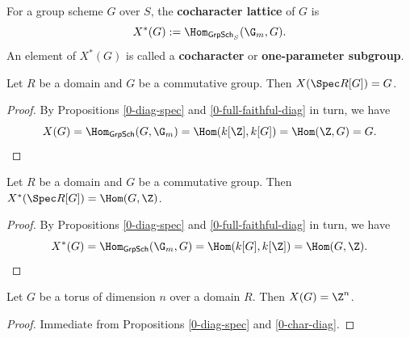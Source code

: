 \begin{definition}
  \label{0-cochar}
  \leanok

  For a group scheme $G$ over $S$, the {\bf cocharacter lattice} of $G$ is
  \[
    X^*(G) := \Hom_{\mathsf{GrpSch}_S}(\G_m, G).
  \]
  An element of $X^*(G)$ is called a {\bf cocharacter} or {\bf one-parameter subgroup}.
\end{definition}


\begin{proposition}
  \label{0-char-diag}
  \leanok

  Let $R$ be a domain and $G$ be a commutative group.
  Then $X(\Spec R[G]) = G$.
\end{proposition}
\begin{proof}
  \leanok

  By Propositions \ref{0-diag-spec} and \ref{0-full-faithful-diag} in turn, we have
  \[
    X(G) = \Hom_{\mathsf{GrpSch}}(G, \G_m) = \Hom(k[\Z], k[G]) = \Hom(\Z, G) = G.
  \]
\end{proof}


\begin{proposition}
  \label{0-cochar-diag}
  \leanok

  Let $R$ be a domain and $G$ be a commutative group.
  Then $X^*(\Spec R[G]) = \Hom(G, \Z)$.
\end{proposition}
\begin{proof}
  \leanok

  By Propositions \ref{0-diag-spec} and \ref{0-full-faithful-diag} in turn, we have
  \[
    X^*(G) = \Hom_{\mathsf{GrpSch}}(\G_m, G) = \Hom(k[G], k[\Z]) = \Hom(G, \Z).
  \]
\end{proof}


\begin{proposition}
  \label{0-char-torus}
  \leanok

  Let $G$ be a torus of dimension $n$ over a domain $R$.
  Then $X(G) = \Z^n$.
\end{proposition}
\begin{proof}
  \leanok

  Immediate from Propositions \ref{0-diag-spec} and \ref{0-char-diag}.
\end{proof}


